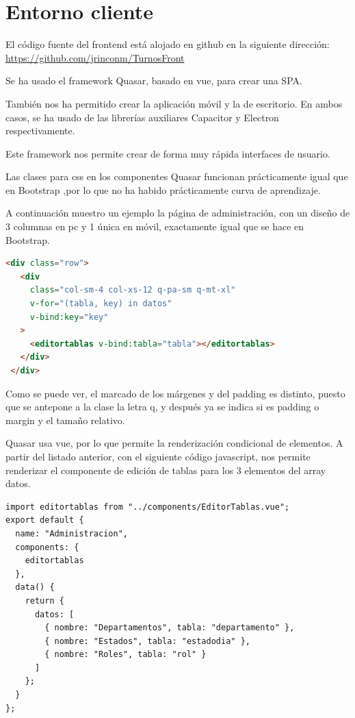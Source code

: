 \documentclass[11pt,spanish,listoffigures,listoftables]{tfgetsinf}
\begin{document}
\section{Entorno cliente}
El código fuente del frontend está alojado en github en la siguiente dirección: \url{https://github.com/jrinconm/TurnosFront}

Se ha usado el framework Quasar, basado en vue, para crear una SPA. 

También nos ha permitido crear la aplicación móvil y la de escritorio. En ambos casos, se ha usado de las librerías auxiliares Capacitor y Electron respectivamente.

Este framework nos permite crear de forma muy rápida interfaces de usuario. 

Las clases para css en los componentes Quasar funcionan prácticamente igual que en Bootstrap ,por lo que no ha habido prácticamente curva de aprendizaje.

A continuación muestro un ejemplo la página de administración, con un diseño de 3 columnas en pc y 1 única en móvil, exactamente igual que se hace en Bootstrap.

\begin{lstlisting}[language=HTML, caption={Template página administración}]
   <div class="row">
   <div
     class="col-sm-4 col-xs-12 q-pa-sm q-mt-xl"
     v-for="(tabla, key) in datos"
     v-bind:key="key"
   >
     <editortablas v-bind:tabla="tabla"></editortablas>
   </div>
 </div>
\end{lstlisting}

Como se puede ver, el marcado de los márgenes y del padding es distinto, puesto que se antepone a la clase la letra q, y después ya se indica si es padding o margin y el tamaño relativo.

Quasar usa vue, por lo que permite la renderización condicional de elementos. A partir del listado anterior, con el siguiente código javascript, nos permite renderizar el componente de edición de tablas para los 3 elementos del array datos.

\begin{lstlisting}[style=ES6, caption={Script página administracón}]
import editortablas from "../components/EditorTablas.vue";
export default {
  name: "Administracion",
  components: {
    editortablas
  },
  data() {
    return {
      datos: [
        { nombre: "Departamentos", tabla: "departamento" },
        { nombre: "Estados", tabla: "estadodia" },
        { nombre: "Roles", tabla: "rol" }
      ]
    };
  }
};
\end{lstlisting}
\end{document}
